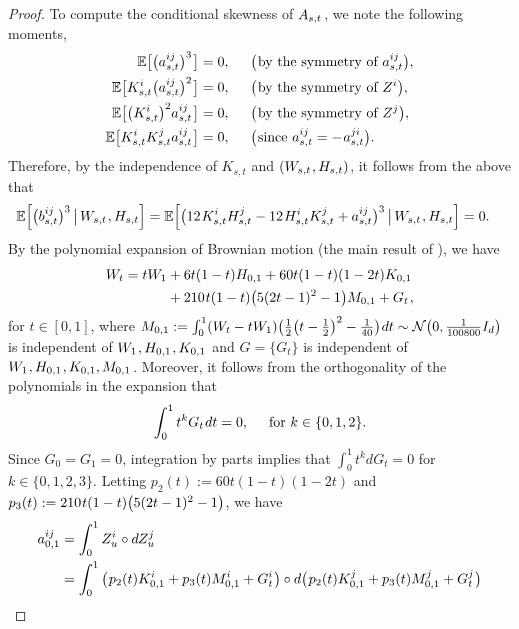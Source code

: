 \documentclass[sn-mathphys-num]{sn-jnl}%
\newcommand{\E}{\mathbb{E}}
\newcommand{\m}{\hspace{0.25mm}}
\newcommand{\mm}{\hspace{5mm}}
\begin{document}
\begin{proof}
To compute the conditional skewness of $A_{s,t}\m$, we note the following moments,
\begin{align*}
\E\big[\big(a_{s,t}^{ij}\big)^3\m\big] & = 0,\mm \big(\m\text{by the symmetry of }a_{s,t}^{ij}\big),\\
\E\big[K_{s,t}^i\big(a_{s,t}^{ij}\big)^2\m\big] & = 0,\mm \big(\m\text{by the symmetry of }Z^i\big),\\
\E\big[\big(K_{s,t}^i\big)^2 a_{s,t}^{ij}\m\big]  & = 0,\mm \big(\m\text{by the symmetry of }Z^j\big),\\
\E\big[K_{s,t}^i K_{s,t}^j a_{s,t}^{ij}\m\big] & = 0,\mm \big(\m\text{since }a_{s,t}^{ij} = -\m a_{s,t}^{ji}\big).
\end{align*}
Therefore, by the independence of $K_{s,t}$ and $(W_{s,t}\m, H_{s,t})$, it follows from the above that
\begin{align*}
\E\Big[\big(b_{s,t}^{ij}\big)^3\,\big|\, W_{s,t}\m, H_{s,t}\Big] & = \E\Big[\big(12\m K_{s,t}^i H_{s,t}^j - 12\m H_{s,t}^i K_{s,t}^j + a_{s,t}^{ij}\big)^3 \,\big|\, W_{s,t}\m, H_{s,t}\Big] = 0.
\end{align*}
By the polynomial expansion of Brownian motion (the main result of \cite{foster2020poly, habermann2021poly}), we have
\begin{align*}
W_t = tW_1 & + 6t(1-t)H_{0,1} + 60t(1-t)(1-2t)K_{0,1}\\
& + 210\m t(1-t)\big(5(2t-1)^2 - 1\big)M_{0,1} + G_t\m,
\end{align*}
for $t\in [0,1]$, where $M_{0,1} := \int_0^1 (W_t - t W_1)\big(\frac{1}{2}\big(t -\frac{1}{2}\big)^2 - \frac{1}{40}\big)\m dt \sim\mathcal{N}\big(0,\frac{1}{100800} I_d\big)$ is\vspace{0.5mm} independent of $W_1\m, H_{0,1}\m, K_{0,1}\m$ and $G = \{G_t\}$ is independent of  $W_1\m, H_{0,1}\m, K_{0,1}, M_{0,1}\m$.
Moreover, it follows from the orthogonality of the polynomials in the expansion that
\begin{align*}
\int_0^1 t^k G_t\m dt = 0,\mm\text{for }k\in\{0,1,2\}.
\end{align*}
Since $G_0 = G_1 = 0$, integration by parts implies that $\int_0^1 t^k d G_t = 0$ for $k\in\{0,1,2,3\}$.
Letting $p_2(t) := 60t(1-t)(1-2t)$ and $p_3(t) := 210\m t(1-t)\big(5(2t-1)^2 - 1\big)$, we have
\begin{align*}
a_{0,1}^{ij} & = \int_0^1 Z_u^i \circ dZ_u^j\\
& = \int_0^1 \big(\m p_2(t)K_{0,1}^i + p_3(t)M_{0,1}^i + G_t^i\m\big) \circ d\big(\m p_2(t)K_{0,1}^j + p_3(t)M_{0,1}^j + G_t^j\m\big)\\

\end{align*}
\end{proof}
\end{document}
